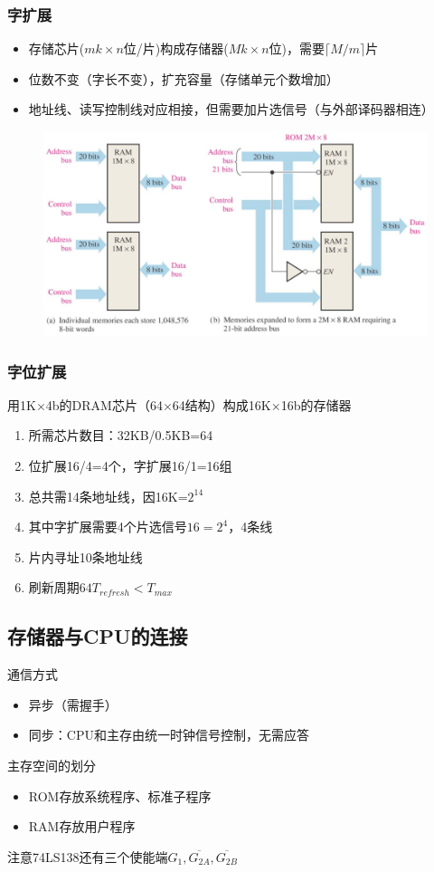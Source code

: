 \subsubsection{字扩展}
\begin{itemize}
	\item 存储芯片($mk\times n$位/片)构成存储器($Mk\times n$位)，需要$\lceil M/m\rceil$片
	\item 位数不变（字长不变），扩充容量（存储单元个数增加）
	\item 地址线、读写控制线对应相接，但需要加片选信号（与外部译码器相连）
\end{itemize}
\begin{figure}[H]
\centering
\includegraphics[width=0.6\linewidth]{fig/word-capacity.PNG}
\end{figure}

\subsubsection{字位扩展}
\begin{example}
用1K$\times$4b的DRAM芯片（64$\times$64结构）构成16K$\times$16b的存储器
\end{example}
\begin{analysis}
\begin{enumerate}
	\item 所需芯片数目：32KB/0.5KB=64
	\item 位扩展16/4=4个，字扩展16/1=16组
	\item 总共需14条地址线，因16K=$2^{14}$
	\item 其中字扩展需要4个片选信号$16=2^4$，4条线
	\item 片内寻址10条地址线
	\item 刷新周期$64T_{refresh}<T_{max}$
\end{enumerate}
\end{analysis}

\subsection{存储器与CPU的连接}
通信方式
\begin{itemize}
	\item 异步（需握手）
	\item 同步：CPU和主存由统一时钟信号控制，无需应答
\end{itemize}
主存空间的划分
\begin{itemize}
	\item ROM存放系统程序、标准子程序
	\item RAM存放用户程序
\end{itemize}
注意74LS138还有三个使能端$G_1,\overline{G_{2A}},\overline{G_{2B}}$


